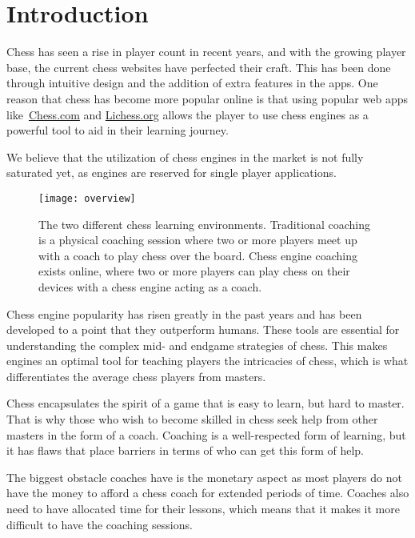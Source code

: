\chapter{Introduction}\label{ch:introduction}

Chess has seen a rise in player count in recent years, and with the growing player base, the current chess websites have
perfected their craft.
This has been done through intuitive design and the addition of extra features in the apps.
One reason that chess has become more popular online is that using popular web apps like~\url{Chess.com} and
\url{Lichess.org} allows the player to use chess engines as a powerful tool to aid in their learning journey.

We believe that the utilization of chess engines in the market is not fully saturated yet, as engines are reserved for
single player applications.

\begin{figure}[htb]
    \centering
    \texttt{[image: overview]}
    \caption{The two different chess learning environments.
    Traditional coaching is a physical coaching session where two or more players meet up with a coach to play chess
    over the board.
    Chess engine coaching exists online, where two or more players can play chess on their devices with a chess engine
    acting as a coach.}\label{fig:project-overview}
\end{figure}

Chess engine popularity has risen greatly in the past years and has been developed to a point that they
outperform humans.
These tools are essential for understanding the complex mid- and endgame strategies of chess.
This makes engines an optimal tool for teaching players the intricacies of chess, which is what
differentiates the average chess players from masters.

Chess encapsulates the spirit of a game that is easy to learn, but hard to master.
That is why those who wish to become skilled in chess seek help from other masters in the form of a coach.
Coaching is a well-respected form of learning, but it has flaws that place barriers in terms of who can get this form of
help.

The biggest obstacle coaches have is the monetary aspect as most players do not have the money to afford a chess coach
for extended periods of time.
Coaches also need to have allocated time for their lessons, which means that it makes it more difficult to have the
coaching sessions.

